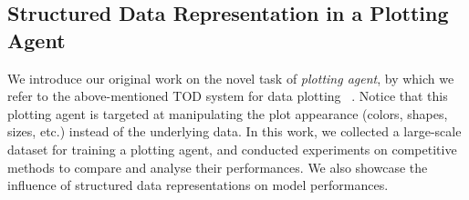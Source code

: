 \documentclass[11pt,dvipdfm]{article}
\begin{document}
\subsection{Structured Data Representation in a Plotting Agent}
We introduce our original work on the novel task of \textit{plotting agent}, by which we refer to the above-mentioned TOD system for data plotting ~\cite{chartdialogs}.
Notice that this plotting agent is targeted at manipulating the plot appearance (colors, shapes, sizes, etc.) instead of the underlying data.
In this work, we collected a large-scale dataset for training a plotting agent, and conducted experiments on competitive methods to compare and analyse their performances. We also showcase the influence of structured data representations on model performances.
\end{document}
